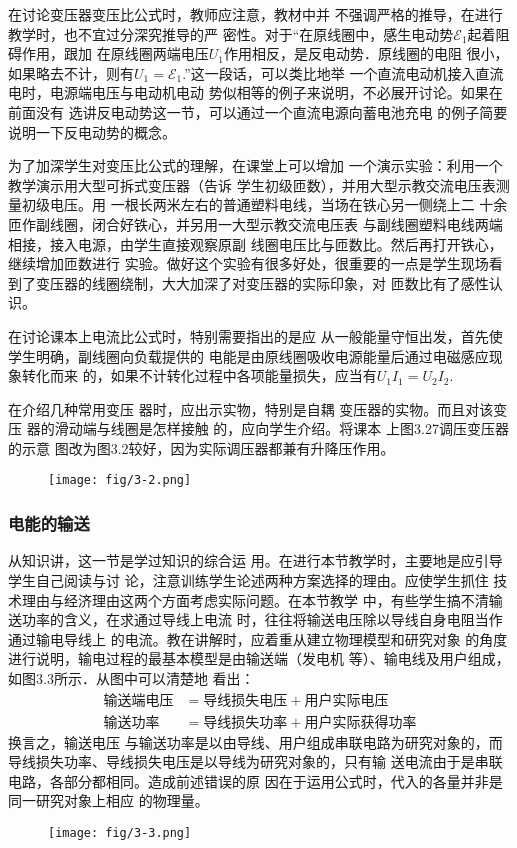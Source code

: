 在讨论变压器变压比公式时，教师应注意，教材中并
不强调严格的推导，在进行教学时，也不宜过分深究推导的严
密性。对于“在原线圈中，感生电动势$\mathcal{E}_1$起着阻碍作用，跟加
在原线圈两端电压$U_1$作用相反，是反电动势．原线圈的电阻
很小，如果略去不计，则有$U_1=\mathcal{E}_1$.”这一段话，可以类比地举
一个直流电动机接入直流电时，电源端电压与电动机电动
势似相等的例子来说明，不必展开讨论。如果在前面没有
选讲反电动势这一节，可以通过一个直流电源向蓄电池充电
的例子简要说明一下反电动势的概念。

为了加深学生对变压比公式的理解，在课堂上可以增加
一个演示实验：利用一个教学演示用大型可拆式变压器（告诉
学生初级匝数），并用大型示教交流电压表测量初级电压。用
一根长两米左右的普通塑料电线，当场在铁心另一侧绕上二
十余匝作副线圈，闭合好铁心，并另用一大型示教交流电压表
与副线圈塑料电线两端相接，接入电源，由学生直接观察原副
线圈电压比与匝数比。然后再打开铁心，继续增加匝数进行
实验。做好这个实验有很多好处，很重要的一点是学生现场看
到了变压器的线圈绕制，大大加深了对变压器的实际印象，对
匝数比有了感性认识。

在讨论课本上电流比公式时，特别需要指出的是应
从一般能量守恒出发，首先使学生明确，副线圈向负载提供的
电能是由原线圈吸收电源能量后通过电磁感应现象转化而来
的，如果不计转化过程中各项能量损失，应当有$U_1I_1=U_2I_2$.

在介绍几种常用变压
器时，应出示实物，特别是自耦
变压器的实物。而且对该变压
器的滑动端与线圈是怎样接触
的，应向学生介绍。将课本
上图3.27调压变压器的示意
图改为图3.2较好，因为实际调压器都兼有升降压作用。
\begin{figure}[htp]
    \centering
\texttt{[image: fig/3-2.png]}
    \caption{}
\end{figure}

\subsubsection{电能的输送}

从知识讲，这一节是学过知识的综合运
用。在进行本节教学时，主要地是应引导学生自己阅读与讨
论，注意训练学生论述两种方案选择的理由。应使学生抓住
技术理由与经济理由这两个方面考虑实际问题。在本节教学
中，有些学生搞不清输送功率的含义，在求通过导线上电流
时，往往将输送电压除以导线自身电阻当作通过输电导线上
的电流。教在讲解时，应着重从建立物理模型和研究对象
的角度进行说明，输电过程的最基本模型是由输送端（发电机
等）、输电线及用户组成，如图3.3所示．从图中可以清楚地
看出：
\[\begin{split}
   \text{输送端电压}&=\text{导线损失电压}+\text{用户实际电压}\\
   \text{输送功率}&=\text{导线损失功率}+\text{用户实际获得功率} 
\end{split}\]
换言之，输送电压
与输送功率是以由导线、用户组成串联电路为研究对象的，而
导线损失功率、导线损失电压是以导线为研究对象的，只有输
送电流由于是串联电路，各部分都相同。造成前述错误的原
因在于运用公式时，代入的各量并非是同一研究对象上相应
的物理量。
\begin{figure}[htp]
    \centering
\texttt{[image: fig/3-3.png]}
    \caption{}
\end{figure}


